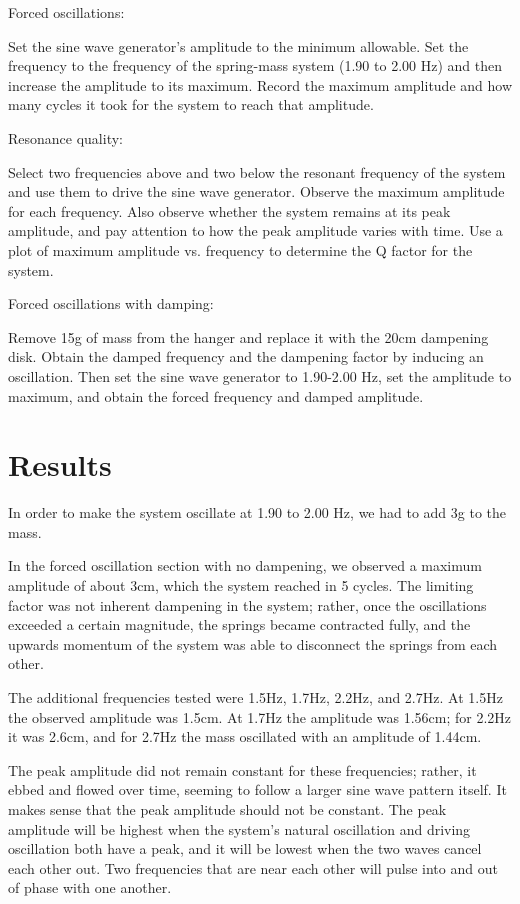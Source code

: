 \documentclass[]{article}
\begin{document}
Forced oscillations:

Set the sine wave generator's amplitude to the minimum allowable. Set the frequency to the frequency of the spring-mass system (1.90 to 2.00 Hz) and then increase the amplitude to its maximum. Record the maximum amplitude and how many cycles it took for the system to reach that amplitude.
\newline

Resonance quality:

Select two frequencies above and two below the resonant frequency of the system and use them to drive the sine wave generator. Observe the maximum amplitude for each frequency. Also observe whether the system remains at its peak amplitude, and pay attention to how the peak amplitude varies with time. Use a plot of maximum amplitude vs. frequency to determine the Q factor for the system.
\newline

Forced oscillations with damping:

Remove 15g of mass from the hanger and replace it with the 20cm dampening disk. Obtain the damped frequency and the dampening factor by inducing an oscillation. Then set the sine wave generator to 1.90-2.00 Hz, set the amplitude to maximum, and obtain the forced frequency and damped amplitude.

\section{Results}

In order to make the system oscillate at 1.90 to 2.00 Hz, we had to add 3g to the mass.
\newline

In the forced oscillation section with no dampening, we observed a maximum amplitude of about 3cm, which the system reached in 5 cycles. The limiting factor was not inherent dampening in the system; rather, once the oscillations exceeded a certain magnitude, the springs became contracted fully, and the upwards momentum of the system was able to disconnect the springs from each other.
\newline

The additional frequencies tested were 1.5Hz, 1.7Hz, 2.2Hz, and 2.7Hz. At 1.5Hz the observed amplitude was 1.5cm. At 1.7Hz the amplitude was 1.56cm; for 2.2Hz it was 2.6cm, and for 2.7Hz the mass oscillated with an amplitude of 1.44cm.
\newline

The peak amplitude did not remain constant for these frequencies; rather, it ebbed and flowed over time, seeming to follow a larger sine wave pattern itself. It makes sense that the peak amplitude should not be constant. The peak amplitude will be highest when the system's natural oscillation and driving oscillation both have a peak, and it will be lowest when the two waves cancel each other out. Two frequencies that are near each other will pulse into and out of phase with one another.
\newline
\end{document}
